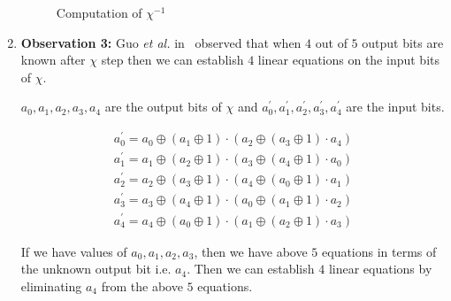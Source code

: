 \documentclass[runningheads]{llncs}
\newcommand{\etal}{\textit{et al. }}
\begin{document}
\begin{enumerate}
\begin{figure}[ht]
\begin{center}
\end{center}
\caption{Computation of $\chi^{-1}$\label{chi_inv2}}
\end{figure}

\item \label{ob3}\textbf{Observation 3:} Guo \etal in~\cite{guo2016linear} observed that when $4$ out of $5$ output bits are known after $\chi$ step then we can establish $4$ linear equations on the input bits of $\chi$.

$a_0, a_1, a_2, a_3, a_4$ are the output bits of $\chi$ and $a_0^\prime, a_1^\prime, a_2^\prime, a_3^\prime, a_4^\prime$ are the input bits.

\begin{align}
a_0^\prime = a_0 \oplus \left( a_{1} \oplus 1\right) \cdot \left( a_{2} \oplus \left( a_{3} \oplus 1 \right) \cdot a_{4}\right)
\end{align}
\begin{align}
a_1^\prime = a_1 \oplus \left( a_{2} \oplus 1\right) \cdot \left( a_{3} \oplus \left( a_{4} \oplus 1 \right) \cdot a_{0}\right)
\end{align}
\begin{align}
a_2^\prime = a_2 \oplus \left( a_{3} \oplus 1\right) \cdot \left( a_{4} \oplus \left( a_{0} \oplus 1 \right) \cdot a_{1}\right)
\end{align}
\begin{align}
a_3^\prime = a_3 \oplus \left( a_{4} \oplus 1\right) \cdot \left( a_{0} \oplus \left( a_{1} \oplus 1 \right) \cdot a_{2}\right)
\end{align}
\begin{align}
a_4^\prime = a_4 \oplus \left( a_{0} \oplus 1\right) \cdot \left( a_{1} \oplus \left( a_{2} \oplus 1 \right) \cdot a_{3}\right)
\end{align}

If we have values of $a_0, a_1, a_2, a_3$, then we have above $5$ equations in terms of the unknown output bit i.e. $a_4$. Then we can establish $4$ linear equations by eliminating $a_4$ from the above $5$ equations.

\end{enumerate}
\end{document}
